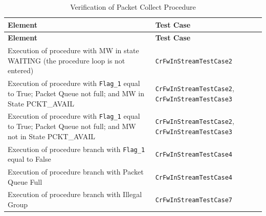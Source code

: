 \documentclass[a4paper,10pt]{article}
\begin{document}
\begin{longtable}{|>{\raggedright}p{6.0cm}|P{5.0cm}|}
\caption{Verification of Packet Collect Procedure}
\label{tab:verPcktCollectProc}\\
\hline
{}
\textbf{Element} & \textbf{Test Case} \\
\hline
\endfirsthead
{}
\textbf{Element} & \textbf{Test Case} \\
\hline
\endhead
Execution of procedure with MW in state WAITING (the procedure loop is not entered) & \texttt{CrFwInStreamTestCase2} \\
\hline
Execution of procedure with \texttt{Flag\_1} equal to True; Packet Queue not full; and MW in State PCKT\_AVAIL & \texttt{CrFwInStreamTestCase2}, \texttt{CrFwInStreamTestCase3}\\
\hline
Execution of procedure with \texttt{Flag\_1} equal to True; Packet Queue not full; and MW not in State PCKT\_AVAIL & \texttt{CrFwInStreamTestCase2}, \texttt{CrFwInStreamTestCase3}\\
\hline
Execution of procedure branch with \texttt{Flag\_1} equal to False & \texttt{CrFwInStreamTestCase4}\\
\hline
Execution of procedure branch with Packet Queue Full & \texttt{CrFwInStreamTestCase4}\\
\hline
Execution of procedure branch with Illegal Group & \texttt{CrFwInStreamTestCase7}\\
\hline
\end{longtable}
\end{document}

